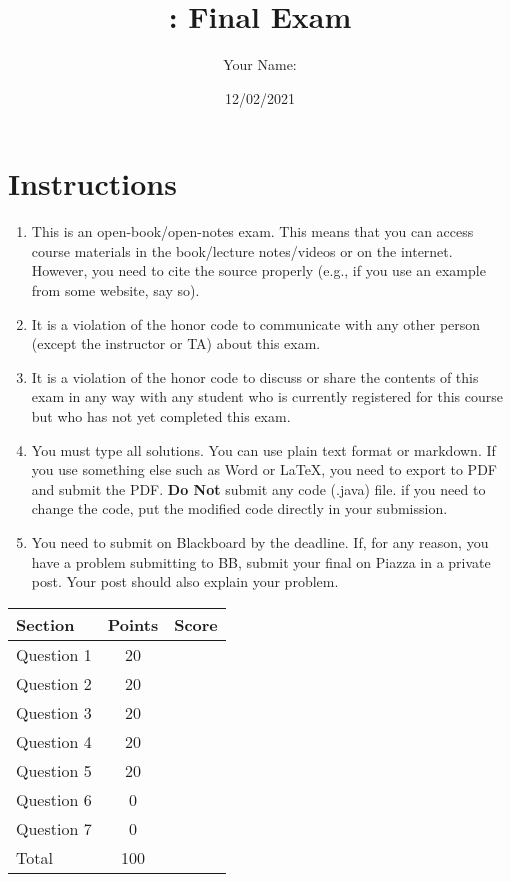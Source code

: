 \documentclass[10pt]{article}
\author{Your Name:}
\date{12/02/2021}
\title{\classname{}: Final Exam}
\begin{document}
\maketitle
\section*{Instructions}

\begin{enumerate}
\item This is an open-book/open-notes exam. This means that you can access course materials in the book/lecture notes/videos or on the internet.  However, you need to cite the source properly (e.g., if you use an example from some website, say so).  

\item It is a violation of the honor code to communicate with any other person (except the instructor or TA) about this exam.

\item It is a violation of the honor code to discuss or share the contents of this exam in any way with any student who is currently registered for this course but who has not yet completed this exam.


\item You must type all solutions.  You can use plain text format or markdown.  If you use something else such as Word or LaTeX, you need to export to PDF and submit the PDF.  \textbf{Do Not} submit any code (.java) file.   if you need to change the code, put the modified code directly in your submission.  

\item You need to submit on Blackboard by the deadline. If, for any reason, you have a problem submitting to BB,  submit your final on Piazza in a private post.  Your post should also explain your problem.

\end{enumerate}


\begin{center}
  \begin{tabular}{lcc}
    \toprule
    Section		&	Points	&	Score \\
    \midrule
    Question 1	&	 20	& \\
    Question 2	&	 20	& \\
    Question 3 	&	 20	& \\
    Question 4 	&	 20	& \\
    Question 5 	&	 20	& \\
    Question 6 	&	 0	& \\
    Question 7 	&	 0	& \\
    \midrule
    Total		&	100	& \\
    \bottomrule
  \end{tabular}
\end{center}
\end{document}
